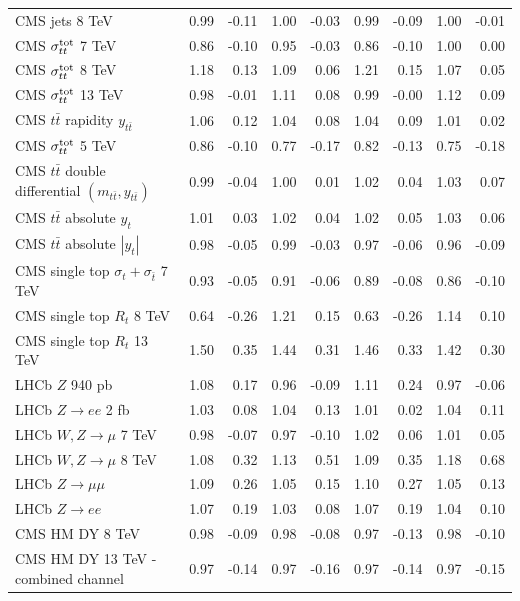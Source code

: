 \documentclass[withindex,glossary]{cam-thesis}
\begin{document}
\begin{table}[H]
\begin{tabular}{lrrrrrrrr}
CMS jets 8 TeV & 0.99 & -0.11 & 1.00 & -0.03 & 0.99 & -0.09 & 1.00 & -0.01 \\
CMS $\sigma_{tt}^{\rm tot}$ 7 TeV & 0.86 & -0.10 & 0.95 & -0.03 & 0.86 & -0.10 & 1.00 & 0.00 \\
CMS $\sigma_{tt}^{\rm tot}$ 8 TeV & 1.18 & 0.13 & 1.09 & 0.06 & 1.21 & 0.15 & 1.07 & 0.05 \\
CMS $\sigma_{tt}^{\rm tot}$ 13 TeV & 0.98 & -0.01 & 1.11 & 0.08 & 0.99 & -0.00 & 1.12 & 0.09 \\
CMS $t\bar{t}$ rapidity $y_{t\bar{t}}$ & 1.06 & 0.12 & 1.04 & 0.08 & 1.04 & 0.09 & 1.01 & 0.02 \\
CMS $\sigma_{tt}^{\rm tot}$ 5 TeV & 0.86 & -0.10 & 0.77 & -0.17 & 0.82 & -0.13 & 0.75 & -0.18 \\
CMS $t\bar{t}$ double differential $(m_{t\bar{t}},y_{t\bar{t}})$ & 0.99 & -0.04 & 1.00 & 0.01 & 1.02 & 0.04 & 1.03 & 0.07 \\
CMS $t\bar{t}$ absolute $y_t$ & 1.01 & 0.03 & 1.02 & 0.04 & 1.02 & 0.05 & 1.03 & 0.06 \\
CMS $t\bar{t}$ absolute $|y_t|$ & 0.98 & -0.05 & 0.99 & -0.03 & 0.97 & -0.06 & 0.96 & -0.09 \\
CMS single top $\sigma_{t}+\sigma_{\bar{t}}$ 7 TeV & 0.93 & -0.05 & 0.91 & -0.06 & 0.89 & -0.08 & 0.86 & -0.10 \\
CMS single top $R_{t}$ 8 TeV & 0.64 & -0.26 & 1.21 & 0.15 & 0.63 & -0.26 & 1.14 & 0.10 \\
CMS single top $R_{t}$ 13 TeV & 1.50 & 0.35 & 1.44 & 0.31 & 1.46 & 0.33 & 1.42 & 0.30 \\
LHCb $Z$ 940 pb & 1.08 & 0.17 & 0.96 & -0.09 & 1.11 & 0.24 & 0.97 & -0.06 \\
LHCb $Z\to ee$ 2 fb & 1.03 & 0.08 & 1.04 & 0.13 & 1.01 & 0.02 & 1.04 & 0.11 \\
LHCb $W,Z \to \mu$ 7 TeV & 0.98 & -0.07 & 0.97 & -0.10 & 1.02 & 0.06 & 1.01 & 0.05 \\
LHCb $W,Z \to \mu$ 8 TeV & 1.08 & 0.32 & 1.13 & 0.51 & 1.09 & 0.35 & 1.18 & 0.68 \\
LHCb $Z\to \mu\mu$ & 1.09 & 0.26 & 1.05 & 0.15 & 1.10 & 0.27 & 1.05 & 0.13 \\
LHCb $Z\to ee$ & 1.07 & 0.19 & 1.03 & 0.08 & 1.07 & 0.19 & 1.04 & 0.10 \\
CMS HM DY 8 TeV & 0.98 & -0.09 & 0.98 & -0.08 & 0.97 & -0.13 & 0.98 & -0.10 \\
CMS HM DY 13 TeV - combined channel & 0.97 & -0.14 & 0.97 & -0.16 & 0.97 & -0.14 & 0.97 & -0.15 \\

\end{tabular}
\end{table}
\end{document}

